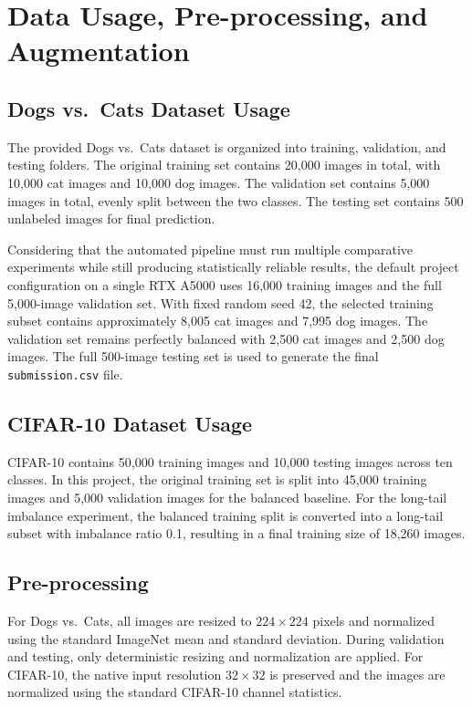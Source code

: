 \documentclass[11pt,a4paper]{article}
\begin{document}
\section{Data Usage, Pre-processing, and Augmentation}

\subsection{Dogs vs.\ Cats Dataset Usage}
The provided Dogs vs.\ Cats dataset is organized into training, validation, and testing folders. The original training set contains 20{,}000 images in total, with 10{,}000 cat images and 10{,}000 dog images. The validation set contains 5{,}000 images in total, evenly split between the two classes. The testing set contains 500 unlabeled images for final prediction.

Considering that the automated pipeline must run multiple comparative experiments while still producing statistically reliable results, the default project configuration on a single RTX A5000 uses 16{,}000 training images and the full 5{,}000-image validation set. With fixed random seed 42, the selected training subset contains approximately 8{,}005 cat images and 7{,}995 dog images. The validation set remains perfectly balanced with 2{,}500 cat images and 2{,}500 dog images. The full 500-image testing set is used to generate the final \texttt{submission.csv} file.

\subsection{CIFAR-10 Dataset Usage}
CIFAR-10 contains 50{,}000 training images and 10{,}000 testing images across ten classes. In this project, the original training set is split into 45{,}000 training images and 5{,}000 validation images for the balanced baseline. For the long-tail imbalance experiment, the balanced training split is converted into a long-tail subset with imbalance ratio 0.1, resulting in a final training size of 18{,}260 images.

\subsection{Pre-processing}
For Dogs vs.\ Cats, all images are resized to $224 \times 224$ pixels and normalized using the standard ImageNet mean and standard deviation. During validation and testing, only deterministic resizing and normalization are applied. For CIFAR-10, the native input resolution $32 \times 32$ is preserved and the images are normalized using the standard CIFAR-10 channel statistics.
\end{document}
